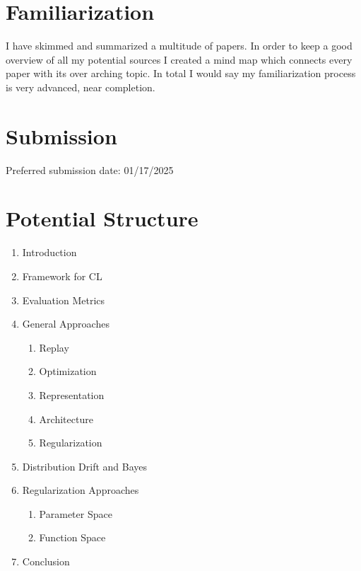 \documentclass[12pt, a4paper]{report}
\begin{document}
\section*{Familiarization}
	I have skimmed and summarized a multitude of papers. In order to keep a good overview of all my potential sources I created a mind map which connects every paper with its over arching topic. In total I would say my familiarization process is very advanced, near completion.
\section*{Submission}
	Preferred submission date: 01/17/2025
\section*{Potential Structure}
\begin{enumerate}
	\item Introduction
	\item Framework for CL
	\item Evaluation Metrics
	\item General Approaches
	\begin{enumerate}
		\item Replay
		\item Optimization
		\item Representation
		\item Architecture
		\item Regularization
	\end{enumerate}
	\item Distribution Drift and Bayes
	\item Regularization Approaches
	\begin{enumerate}
		\item Parameter Space
		\item Function Space
	\end{enumerate}
	\item Conclusion
\end{enumerate}
\end{document}
